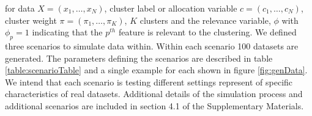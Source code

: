\documentclass{bioinfo}
\begin{document}
for data $X=(x_1, \ldots, x_N)$, cluster label or allocation variable $c=(c_1, \ldots, c_N)$, cluster weight $\pi=(\pi_1, \ldots, \pi_K)$, $K$ clusters and the relevance variable, $\phi$ with $\phi_p=1$ indicating that the $p^{th}$ feature is relevant to the clustering. We defined three scenarios to simulate data within. Within each scenario 100 datasets are generated. The parameters defining the scenarios are described in table \ref{table:scenarioTable} and a single example for each shown in figure \ref{fig:genData}. We intend that each scenario is testing different settings represent of specific characteristics of real datasets. Additional details of the simulation process and additional scenarios are included in section 4.1 of the Supplementary Materials.

\end{document}
